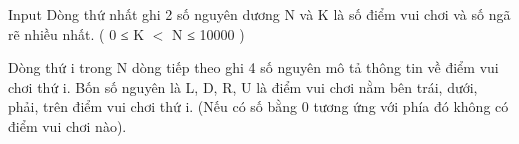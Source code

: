 Input
Dòng thứ nhất ghi 2 số nguyên dương N và K là số điểm vui chơi và số ngã rẽ nhiều nhất. ( 0 ≤ K $<$ N ≤ 10000 )  

   Dòng thứ i trong N dòng tiếp theo ghi 4 số nguyên mô tả thông tin về điểm vui chơi thứ i. Bốn số nguyên là L, D, R, U là điểm vui chơi nằm bên trái, dưới, phải, trên điểm vui chơi thứ i. (Nếu có số bằng 0 tương ứng với phía đó không có điểm vui chơi nào).